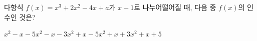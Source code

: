 다항식 $f(x)=x^3+2x^2-4x+a$가 $x+1$로 나누어떨어질 때, 다음 중 $f(x)$의 인수인 것은? 
\begin{choices32}{$x^2-x-5$}{$x^2-x-3$}{$x^2+x-5$}{$x^2+x+3$}{$x^2+x+5$}\end{choices32}
